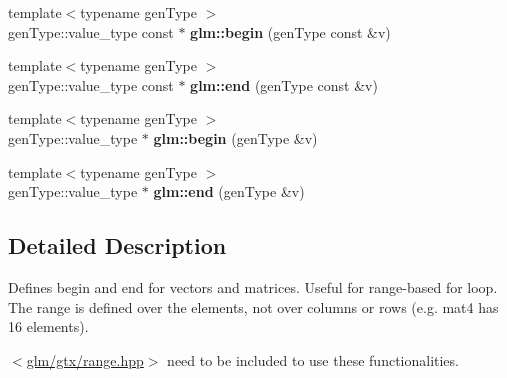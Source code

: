 \begin{DoxyCompactItemize}
\item 
\mbox{\label{group__gtx__range_gaadcca0cd1ffc54deb39e983bfdcbcdd2}} 
{\footnotesize template$<$typename gen\+Type $>$ }\\gen\+Type\+::value\+\_\+type const  $\ast$ {\bfseries glm\+::begin} (gen\+Type const \&v)
\item 
\mbox{\label{group__gtx__range_ga785aa0c9cf7d925318863f950eb81618}} 
{\footnotesize template$<$typename gen\+Type $>$ }\\gen\+Type\+::value\+\_\+type const  $\ast$ {\bfseries glm\+::end} (gen\+Type const \&v)
\item 
\mbox{\label{group__gtx__range_gacc3851df89b9238430e39525c3518ced}} 
{\footnotesize template$<$typename gen\+Type $>$ }\\gen\+Type\+::value\+\_\+type $\ast$ {\bfseries glm\+::begin} (gen\+Type \&v)
\item 
\mbox{\label{group__gtx__range_ga0c303e8c522b139252646a93d5e490d4}} 
{\footnotesize template$<$typename gen\+Type $>$ }\\gen\+Type\+::value\+\_\+type $\ast$ {\bfseries glm\+::end} (gen\+Type \&v)
\end{DoxyCompactItemize}


\subsection{Detailed Description}
Defines begin and end for vectors and matrices. Useful for range-\/based for loop. The range is defined over the elements, not over columns or rows (e.\+g. mat4 has 16 elements). 

$<$\hyperlink{range_8hpp}{glm/gtx/range.\+hpp}$>$ need to be included to use these functionalities. 